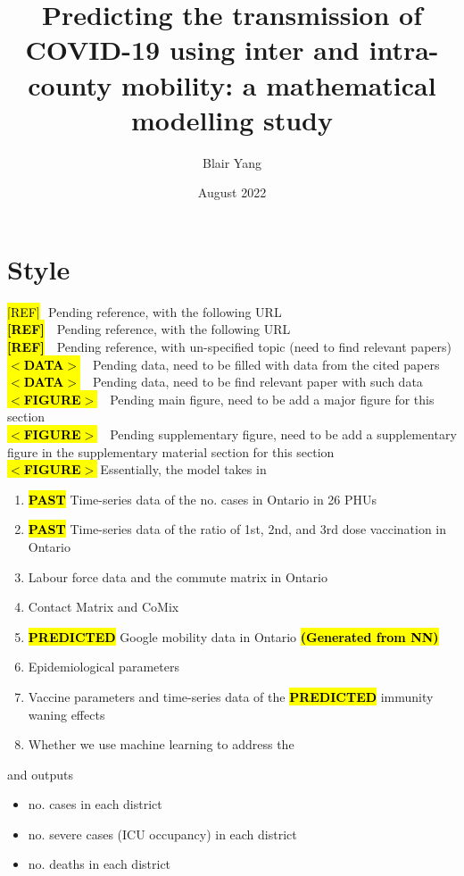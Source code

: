 \documentclass[12pt]{article}
\title{Predicting the transmission of COVID-19 using inter and intra-county mobility: a mathematical modelling study}
\author{Blair Yang}
\date{August 2022}
\newcommand{\emphasize}[1]{\textcolor{ReD}{\textbf{\hl{#1}}}}
\newcommand{\important}[1]{{\textbf{\hl{#1}}}}
\newcommand{\urlref}{\hl{[REF]}}
\newcommand{\pendingref}{\textbf{\hl{[REF]}}$ \ $}
\newcommand{\unknownref}{\textcolor{ReD}{\textbf{\hl{[REF]}}}$ \ $}
\newcommand{\pendingdata}{\textbf{\hl{$<$DATA$>$}}$ \ $}
\newcommand{\unknowndata}{\textcolor{ReD}{\textbf{\hl{$<$DATA$>$}}}$ \ $}
\newcommand{\suppfigure}{{\textbf{\hl{$<$FIGURE$>$}}}$ \ $}
\newcommand{\mainfigure}{\textcolor{ReD}{\textbf{\hl{$<$FIGURE$>$}}}$ \ $}
\begin{document}
\maketitle

\section*{Style}
\urlref $ \ \ \ $Pending reference, with the following URL\\
\pendingref $ \ \ $ Pending reference, with the following URL\\
\unknownref $ \ \ $ Pending reference, with un-specified topic (need to find relevant papers)\\
\pendingdata $ \ \ $ Pending data, need to be filled with data from the cited papers\\
\unknowndata $ \ \ $ Pending data, need to be find relevant paper with such data\\
\mainfigure $ \ \ $ Pending main figure, need to be add a major figure for this section\\
\suppfigure $ \ \ $ Pending supplementary figure, need to be add a supplementary figure in the supplementary material section for this section\\

\mainfigure Essentially, the model takes in
\begin{enumerate}
    \item \important{PAST} Time-series data of the no. cases in Ontario in 26 PHUs
    \item \important{PAST} Time-series data of the ratio of 1st, 2nd, and 3rd dose vaccination in Ontario
    \item Labour force data and the commute matrix in Ontario
    \item Contact Matrix and CoMix
    \item \important{PREDICTED} Google mobility data in Ontario \emphasize{(Generated from NN)}
    \item Epidemiological parameters
    \item Vaccine parameters and time-series data of the \important{PREDICTED} immunity waning effects
    \item Whether we use machine learning to address the
\end{enumerate}
and outputs
\begin{itemize}
    \item no. cases in each district
    \item no. severe cases (ICU occupancy) in each district
    \item no. deaths in each district
\end{itemize}
\end{document}
